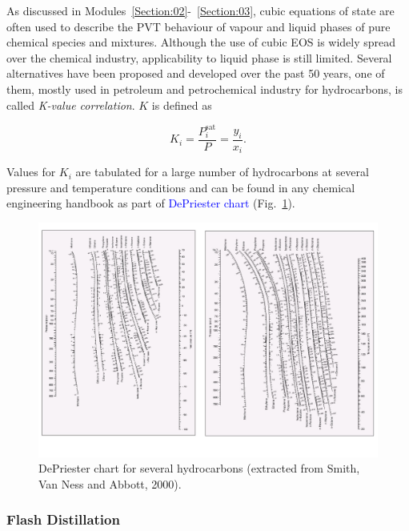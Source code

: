 \documentclass[12pts,a4paper,amsmath,amssymb,floatfix]{article}%
\newcommand{\frc}{\displaystyle\frac}
\newcommand{\blue}{\textcolor{blue}}
\begin{document}
As discussed in Modules~\ref{Section:02}-~\ref{Section:03}, cubic equations of state are often used to describe the PVT behaviour of vapour and liquid phases of pure chemical species and mixtures. Although the use of cubic EOS is widely spread over the chemical industry, applicability to liquid phase is still limited. Several alternatives have been proposed and developed over the past 50 years, one of them, mostly used in petroleum and petrochemical industry for hydrocarbons, is called {\it K-value correlation}. $K$ is defined as
\begin{shaded}
   \begin{equation}
      K_{i} = \frc{P_{i}^{\text{sat}}}{P} = \frc{y_{i}}{x_{i}}.\label{Mod04_KValue}
   \end{equation}
\end{shaded}
Values for $K_{i}$ are tabulated for a large number of hydrocarbons at several pressure and temperature conditions and can be found in any chemical engineering handbook as part of \blue{DePriester chart} (Fig.~\ref{Mod04Fig05}).
  \begin{figure}[h]
     \begin{center}
         \includegraphics[width=1.\linewidth,clip]{./Figs/DePriesterCharts}
     \end{center}
     \caption{DePriester chart for several hydrocarbons (extracted from Smith, Van Ness and Abbott, 2000).}\label{Mod04Fig05}
  \end{figure}


\subsubsection{Flash Distillation}\label{Section:04:FlashDistillation}
\end{document}
